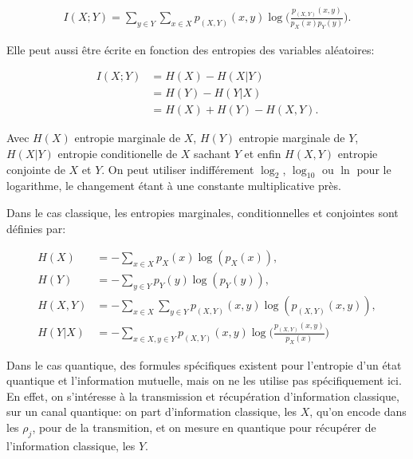 \begin{align}
    I(X;Y) = \displaystyle \sum_{y \in Y} \displaystyle \sum_{x \in X} p_{(X, Y)}(x, y) \log \big(\frac{p_{(X, Y)}(x, y)}{p_X(x) p_Y(y)}\big).
\end{align}

Elle peut aussi être écrite en fonction des entropies des variables aléatoires:

\begin{align}
    I(X; Y) &= H(X) - H(X | Y) \\
            &= H(Y) - H(Y | X) \\
            &= H(X) + H(Y) - H(X, Y).
\end{align}

Avec $H(X)$ entropie marginale de $X$, $H(Y)$ entropie marginale de $Y$, $H(X|Y)$ entropie conditionelle de $X$ sachant $Y$ et enfin $H(X, Y)$ entropie conjointe de $X$ et $Y$. On peut utiliser indifférement $\log_2$, $\log_{10}$ ou $\ln$ pour le logarithme, le changement étant à une constante multiplicative près.

Dans le cas classique, les entropies marginales, conditionnelles et conjointes sont définies par: 

\begin{align}
    H(X) &= -\displaystyle \sum_{x \in X} p_{X}(x) \log(p_{X}(x)) , \\
    H(Y) &= -\displaystyle \sum_{y \in Y} p_{Y}(y) \log(p_{Y}(y)) , \\
    H(X, Y) &= -\displaystyle \sum_{x \in X} \displaystyle \sum_{y \in Y} p_{(X, Y)}(x, y) \log(p_{(X, Y)}(x, y)), \\
    H(Y|X) &= -\displaystyle \sum_{x \in X, y \in Y} p_{(X, Y)}(x, y) \log \big(\frac{p_{(X, Y)}(x, y)}{p_{X}(x)}\big)
\end{align}

Dans le cas quantique, des formules spécifiques existent pour l'entropie d'un état quantique et l'information mutuelle, mais on ne les utilise pas spécifiquement ici. En effet, on s'intéresse à la transmission et récupération d'information classique, sur un canal quantique: on part d'information classique, les $X$, qu'on encode dans les $\rho_j$, pour de la transmition, et on mesure en quantique pour récupérer de l'information classique, les $Y$.


\medbreak

